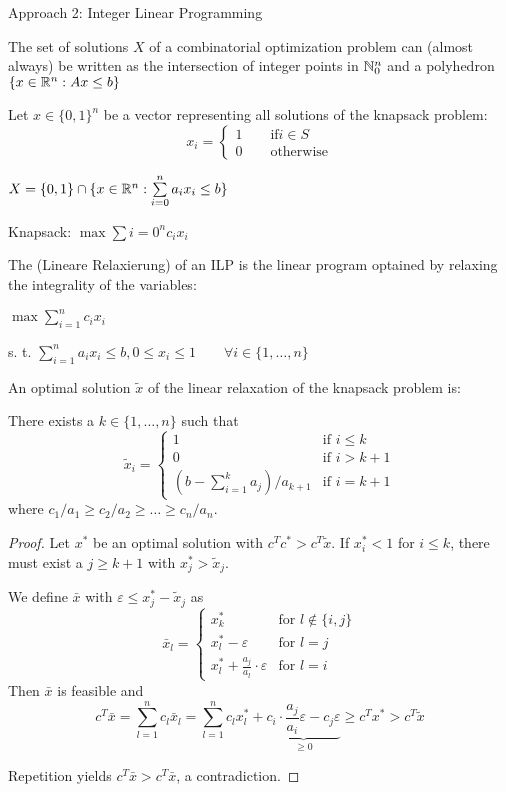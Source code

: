 Approach 2: Integer Linear Programming

The set of solutions $X$ of a combinatorial optimization problem can (almost always) be written as the intersection of integer points in $\mathbb{N}_0^n$ and a polyhedron $\{x \in \mathbb{R}^n: Ax\leq b\}$

Let $x \in \{0,1\}^n$ be a vector representing all solutions of the knapsack problem:
\[
	x_i = \begin{cases}
		1 \qquad \text{if} i \in S \\
		0 \qquad \text{otherwise}
	\end{cases}
\]

$X = \{0,1\} \cap \{ x \in \mathbb{R}^n: \sum\limits_{i = 0}^n a_ix_i\leq b\}$

Knapsack: $\max \sum{i = 0}^n c_i x_i$

The  (Lineare Relaxierung) of an ILP is the linear program optained by relaxing the integrality of the variables:

$\max \sum_{i=1}^n c_i x_i$

s. t. $\sum_{i=1}^n a_i x_i \leq b, 0 \leq x_i \leq 1 \qquad \forall i \in \{1, …, n\}$

\begin{thm}
An optimal solution $\tilde{x}$ of the linear relaxation of the knapsack
problem is:

There exists a $k \in \{1, …, n\}$ such that 
\[
\tilde{x}_i = \left \{ \begin{array}{ll}
1 & \text{if } i \leq k \\ 
0 & \text{if } i > k+1 \\
(b-\sum^k_{i=1} a_j) / a_{k+1} & \text{if } i=k+1
\end{array} \right.
\]
where $c_1/a_1 \geq c_2 / a_2 \geq … \geq c_n / a_n$.
\end{thm}

\begin{proof}
Let $x^*$ be an optimal solution with $c^T c^* > c^T \tilde{x}$.
If $x^*_i < 1$ for $i \leq k$, there must exist a $j \geq k+1$ with $x^*_j >
\tilde{x}_j$.

We define $\bar{x}$ with $\varepsilon \leq x^*_j - \tilde{x}_j$ as
\[
\bar{x}_l = \left \{ \begin{array}{ll}
x^*_k & \text{for } l \not\in \{i, j\} \\
x^*_l - \varepsilon & \text{for } l=j \\
x^*_l + \frac{a_j}{a_l} \cdot \varepsilon & \text{for } l=i
\end{array} \right.
\]
Then $\bar{x}$ is feasible and
\[
c^T \bar{x} = \sum_{l=1}^n c_l \bar{x}_l =
\sum_{l=1}^n c_l x^*_l + \underbrace{c_i \cdot \frac{a_j}{a_i} \varepsilon - c_j
\varepsilon}_{\geq 0} \geq c^T x^* > c^T \tilde{x}
\]

Repetition yields $c^T \bar{x} > c^T \bar{x}$, a contradiction.
\end{proof}

